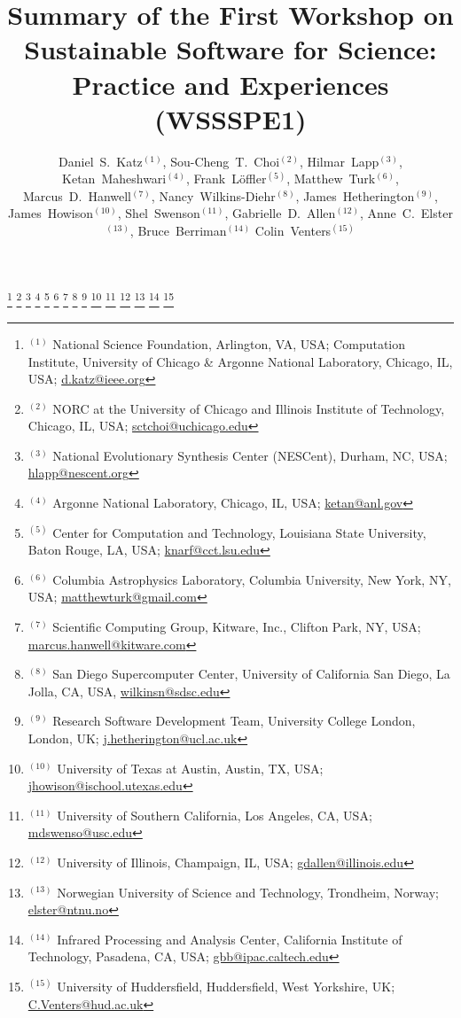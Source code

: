 \documentclass[11pt, oneside]{amsart}
\newcommand{\note}[1]{ {\textcolor{red}    { #1 }}}
\begin{document}
\title[]{Summary of the First Workshop on Sustainable Software for Science: Practice and Experiences (WSSSPE1)}

\author{Daniel~S.~Katz$^{(1)}$,
Sou-Cheng~T.~Choi$^{(2)}$,
Hilmar~Lapp$^{(3)}$,
Ketan~Maheshwari$^{(4)}$,
Frank~L\"{o}ffler$^{(5)}$,
Matthew~Turk$^{(6)}$,
Marcus~D.~Hanwell$^{(7)}$,
Nancy~Wilkins-Diehr$^{(8)}$,
James~Hetherington$^{(9)}$,
James~Howison$^{(10)}$,
Shel~Swenson$^{(11)}$,
Gabrielle~D.~Allen$^{(12)}$,
Anne~C.~Elster$^{(13)}$,
Bruce~Berriman$^{(14)}$
Colin~Venters$^{(15)}$
}

\thanks{{}$^{(1)}$ National Science Foundation, Arlington, VA, USA; Computation Institute, University of Chicago \& Argonne National Laboratory, Chicago, IL, USA; \url{d.katz@ieee.org}}
%
\thanks{{}$^{(2)}$ NORC at the University of Chicago and   Illinois Institute of Technology, Chicago, IL, USA; \url{sctchoi@uchicago.edu}}
%
\thanks{{}$^{(3)}$ National Evolutionary Synthesis Center (NESCent),
  Durham, NC, USA; \url{hlapp@nescent.org}}
%
\thanks{{}$^{(4)}$ Argonne National Laboratory, Chicago, IL, USA; \url{ketan@anl.gov}}
%
\thanks{{}$^{(5)}$ Center for Computation and Technology, Louisiana State University, Baton Rouge, LA, USA; \url{knarf@cct.lsu.edu}}
%
\thanks{{}$^{(6)}$ Columbia Astrophysics Laboratory, Columbia University, New
York, NY, USA; \url{matthewturk@gmail.com}}
%
\thanks{{}$^{(7)}$ Scientific Computing Group, Kitware, Inc.,  Clifton Park, NY, USA; \url{marcus.hanwell@kitware.com}}
%
\thanks{{}$^{(8)}$ San Diego Supercomputer Center, University of California San Diego, La Jolla, CA, USA, \url{wilkinsn@sdsc.edu}}
%
\thanks{{}$^{(9)}$ Research Software Development Team, University College London, London, UK; \url {j.hetherington@ucl.ac.uk}}
%
\thanks{{}$^{(10)}$ University of Texas at Austin, Austin, TX, USA; \url{jhowison@ischool.utexas.edu}}
%
\thanks{{}$^{(11)}$ University of Southern California, Los Angeles, CA, USA; \url{mdswenso@usc.edu}}
%
\thanks{{}$^{(12)}$ University of Illinois, Champaign, IL, USA; \url{gdallen@illinois.edu}}
%
\thanks{{}$^{(13)}$ Norwegian University of Science and Technology, Trondheim, Norway; \url{elster@ntnu.no}}
%
\thanks{{}$^{(14)}$ Infrared Processing and Analysis Center, California Institute of Technology, Pasadena, CA, USA; \url{gbb@ipac.caltech.edu}}
%
\thanks{{}$^{(15)}$ University of Huddersfield, Huddersfield, West Yorkshire, UK; \url{C.Venters@hud.ac.uk}}
\end{document}

